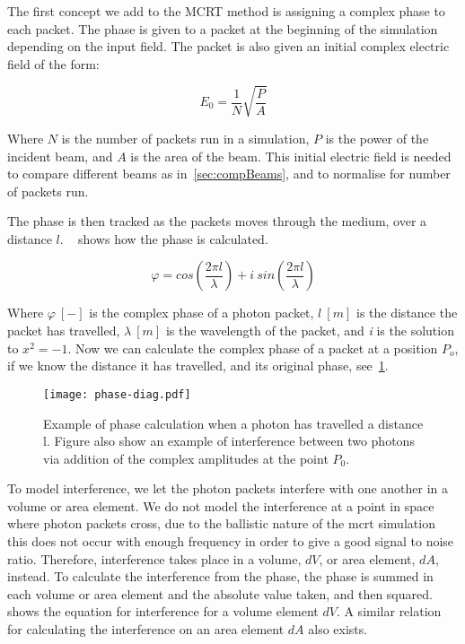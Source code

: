 The first concept we add to the MCRT method is assigning a complex phase to each packet.
The phase is given to a packet at the beginning of the simulation depending on the input field.
The packet is also given an initial complex electric field of the form:

\begin{equation}
E_0 = \frac{1}{N}\sqrt{\frac{P}{A}}
\label{eqn:initefield}
\end{equation}

Where $N$ is the number of packets run in a simulation, $P$ is the power of the incident beam, and $A$ is the area of the beam.
This initial electric field is needed to compare different beams as in~\cref{sec:compBeams}, and to normalise for number of packets run.

The phase is then tracked as the packets moves through the medium, over a distance $l$.
~ shows how the phase is calculated.

\begin{equation}
    \varphi = cos\left(\frac{2 \pi l}{\lambda}\right) + i\ sin\left(\frac{2 \pi l}{\lambda}\right)
    \label{eqn:phase}
\end{equation}

Where $\varphi~[-]$ is the complex phase of a photon packet, $l\ [m]$ is the distance the packet has travelled, $\lambda~[m]$ is the wavelength of the packet, and \textit{i} is the solution to $x^2=-1$.
Now we can calculate the complex phase of a packet at a position $P_o$, if we know the distance it has travelled, and its original phase, see~\cref{fig:phase-diag}.

\begin{figure}[!ht]
    \centering
    \texttt{[image: phase-diag.pdf]}
    \caption{Example of phase calculation when a photon has travelled a distance l. Figure also show an example of interference between two photons via addition of the complex amplitudes at the point $P_0$.}
    \label{fig:phase-diag}
\end{figure}

To model interference, we let the photon packets interfere with one another in a volume or area element. 
We do not model the interference at a point in space where photon packets cross, due to the ballistic nature of the \gls*{mcrt} simulation this does not occur with enough frequency in order to give a good signal to noise ratio. 
Therefore, interference takes place in a volume, $dV$, or area element, $dA$, instead.
To calculate the interference from the phase, the phase is summed in each volume or area element and the absolute value taken, and then squared.~ shows the equation for interference for a volume element $dV$. A similar relation for calculating the interference on an area element $dA$ also exists.

